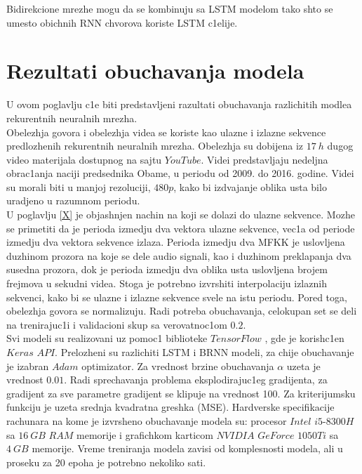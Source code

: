 \documentclass[a4paper, openany, oneside, 11pt]{book}
\begin{document}
Bidirekcione mrezhe mogu da se kombinuju sa \acrshort{LSTM} modelom tako shto se umesto obichnih \acrshort{RNN} chvorova koriste \acrshort{LSTM} c1elije.
\chapter{Rezultati obuchavanja modela}
U ovom poglavlju c1e biti predstavljeni razultati obuchavanja razlichitih modlea rekurentnih neuralnih mrezha.\\
Obelezhja govora i obelezhja videa se koriste kao ulazne i izlazne sekvence predlozhenih rekurentnih neuralnih mrezha. Obelezhja su dobijena iz $\SI{17}{h}$ dugog video materijala dostupnog na sajtu $YouTube$. Videi predstavljaju nedeljna obrac1anja naciji predsednika Obame, u periodu od 2009. do 2016. godine. Videi su morali biti u manjoj rezoluciji, $480p$, kako bi izdvajanje oblika usta bilo uradjeno u razumnom periodu.\\
U poglavlju \ref{X} je objash\-njen nachin na koji se dolazi do ulazne sekvence. Mozhe se primetiti da je perioda izmedju dva vektora ulazne sekvence, vec1a od periode izmedju dva vektora sekvence izlaza. Perioda izmedju dva \acrshort{MFKK} je uslovljena duzhinom prozora na koje se dele audio signali, kao i duzhinom preklapanja dva susedna prozora, dok je perioda izmedju dva oblika usta uslovljena brojem frejmova u sekudni videa. Stoga je potrebno  izvrshiti interpolaciju izlaznih sekvenci, kako bi se ulazne i izlazne sekvence svele na istu periodu. Pored toga, obelezhja govora se normalizuju. Radi potreba obuchavanja, celokupan set se deli na trenirajuc1i i validacioni skup sa verovatnoc1om $0.2$.\\
Svi modeli su realizovani uz pomoc1 biblioteke $TensorFlow$ \cite{TF}, gde je korish\-c1en $Keras$ $API$. Prelozheni su razlichiti \acrshort{LSTM} i \acrshort{BRNN} modeli, za chije obuchavanje je izabran $Adam$ \cite{Adam} optimizator. Za vrednost brzine obuchavanja $\alpha$ uzeta je vrednost $0.01$. Radi sprechavanja problema eksplodirajuc1eg gradijenta, za gradijent za sve parametre gradijent se klipuje na vrednost 100. Za kriterijumsku funkciju je uzeta srednja kvadratna greshka (\acrshort{MSE}). Hardverske specifikacije rachunara na kome je izvrsheno obuchavanje modela su: procesor $Intel$ $i5$-$8300H$ sa $\SI{16}{GB}$ $RAM$ memorije i grafichkom karticom $NVIDIA$ $GeForce$ $1050Ti$ sa $\SI{4}{GB}$ memorije. Vreme treniranja modela zavisi od komplesnosti modela, ali u proseku za 20 epoha je potrebno nekoliko sati.
\end{document}
